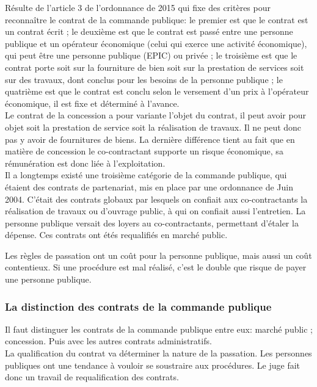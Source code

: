 \documentclass[10pt, a4paper, openany]{book}
\begin{document}
Résulte de l'article 3 de l'ordonnance de 2015 qui fixe des critères pour reconnaître le contrat de la commande publique: le premier est que le contrat est un contrat écrit ; le deuxième est que le contrat est passé entre une personne publique et un opérateur économique (celui qui exerce une activité économique), qui peut être une personne publique (EPIC) ou privée ; le troisième est que le contrat porte soit sur la fourniture de bien soit sur la prestation de services soit sur des travaux, dont conclus pour les besoins de la personne publique ; le quatrième est que le contrat est conclu selon le versement d'un prix à l'opérateur économique, il est fixe et déterminé à l'avance. \\
Le contrat de la concession a pour variante l'objet du contrat, il peut avoir pour objet soit la prestation de service soit la réalisation de travaux. Il ne peut donc pas y avoir de fournitures de biens. La dernière différence tient au fait que en matière de concession le co-contractant supporte un risque économique, sa rémunération est donc liée à l'exploitation. \\
Il a longtemps existé une troisième catégorie de la commande publique, qui étaient des contrats de partenariat, mis en place par une ordonnance de Juin 2004. C'était des contrats globaux par lesquels on confiait aux co-contractants la réalisation de travaux ou d'ouvrage public, à qui on confiait aussi l'entretien. La personne publique versait des loyers au co-contractants, permettant d'étaler la dépense. Ces contrats ont étés requalifiés en marché public. 


Les règles de passation ont un coût pour la personne publique, mais aussi un coût contentieux. Si une procédure est mal réalisé, c'est le double que risque de payer une personne publique.

\subsubsection{La distinction des contrats de la commande publique}

Il faut distinguer les contrats de la commande publique entre eux: marché public ; concession. Puis avec les autres contrats administratifs. \\
La qualification du contrat va déterminer la nature de la passation. Les personnes publiques ont une tendance à vouloir se soustraire aux procédures. Le juge fait donc un travail de requalification des contrats. 
\end{document}
